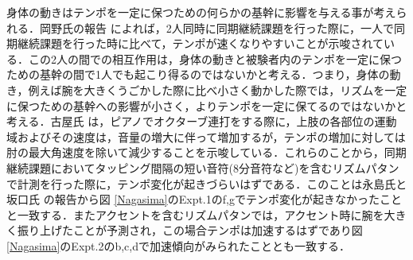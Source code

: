\documentclass[twocolumn,10pt]{jarticle}
\begin{document}
身体の動きはテンポを一定に保つための何らかの基幹に影響を与える事が考えられる．岡野氏の報告 \cite{Okano}によれば，2人同時に同期継続課題を行った際に，一人で同期継続課題を行った時に比べて，テンポが速くなりやすいことが示唆されている．この2人の間での相互作用は，身体の動きと被験者内のテンポを一定に保つための基幹の間で1人でも起こり得るのではないかと考える．つまり，身体の動き，例えば腕を大きくうごかした際に比べ小さく動かした際では，リズムを一定に保つための基幹への影響が小さく，よりテンポを一定に保てるのではないかと考える．古屋氏 \cite{Huruya}は，ピアノでオクターブ連打をする際に，上肢の各部位の運動域およびその速度は，音量の増大に伴って増加するが，テンポの増加に対しては肘の最大角速度を除いて減少することを示唆している．これらのことから，同期継続課題においてタッピング間隔の短い音符(8分音符など)を含むリズムパタンで計測を行った際に，テンポ変化が起きづらいはずである．このことは永島氏と坂口氏 \cite{Nagasima}の報告から図 {\ref{Nagasima}}のExpt.1のf,gでテンポ変化が起きなかったことと一致する．またアクセントを含むリズムパタンでは，アクセント時に腕を大きく振り上げたことが予測され，この場合テンポは加速するはずであり図 \ref{Nagasima}のExpt.2のb,c,dで加速傾向がみられたこととも一致する．
\end{document}
